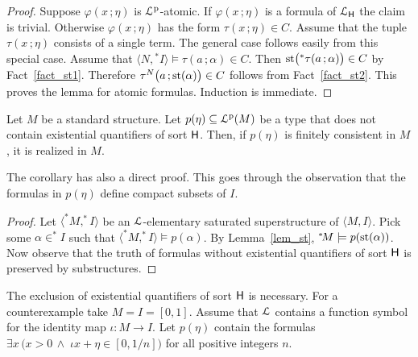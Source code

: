 \documentclass{amsproc}
\begin{document}
\begin{proof}
  Suppose $\varphi(x\,;\eta)$ is ${\EuScript L}^{\rm p}$-atomic.
  If $\varphi(x\,;\eta)$ is a formula of ${\EuScript L}_{\sf H}$ the claim is trivial. 
  Otherwise $\varphi(x\,;\eta)$ has the form $\tau(x\,;\eta)\in C$.
  Assume that the tuple $\tau(x\,;\eta)$ consists of a single term.
  The general case follows easily from this special case. 
  Assume that $\langle N,{}^*\!\!I\rangle\models \tau(a\,;\alpha)\in C$.
  Then ${\rm st}\big({}^*\tau(a\,;\alpha)\big)\in C$ by Fact~\ref{fact_st1}.
  Therefore $\tau^N\big(a\,;{\rm st}(\alpha)\big)\in C$ follows from Fact~\ref{fact_st2}.
  This proves the lemma for atomic formulas.
  Induction is immediate. 
\end{proof}

\begin{corollary}\label{corol_st}
  Let $M$ be a standard structure.
  Let $p(\eta)\subseteq{\EuScript L}^{\rm p}(M)$ be a type that does not contain existential quantifiers of sort ${\sf H}$.
  Then, if $p(\eta)$ is finitely consistent in $M$, it is realized in $M$.
 \end{corollary}
 
 The corollary has also a direct proof.
 This goes through the observation that the formulas in $p(\eta)$ define compact subsets of $I$.

 \begin{proof}
  Let $\langle ^*\!M,^*\!\!I\rangle$ be an ${\EuScript L}$-elementary saturated superstructure of $\langle M,I\rangle$.
  Pick some $\alpha\in ^*\!\!I$ such that $\langle ^*\!M,^*\!\!I\rangle\models p(\alpha)$.
  By Lemma~\ref{lem_st}, $^*\!M\models p({\rm st}(\alpha))$.
  Now observe that the truth of formulas without  existential quantifiers of sort ${\sf H}$ is preserved by substructures.
 \end{proof}
 
 The exclusion of existential quantifiers of sort ${\sf H}$ is necessary.
 For a counterexample take $M=I=[0,1]$.
 Assume that ${\EuScript L}$ contains a function symbol for the identity map $\iota:M\to I$.
 Let $p(\eta)$ contain the formulas $\exists x\,\big(x>0\,\wedge\;\iota x+\eta\in[0,1/n]\big)$ for all positive integers $n$.

\end{document}
